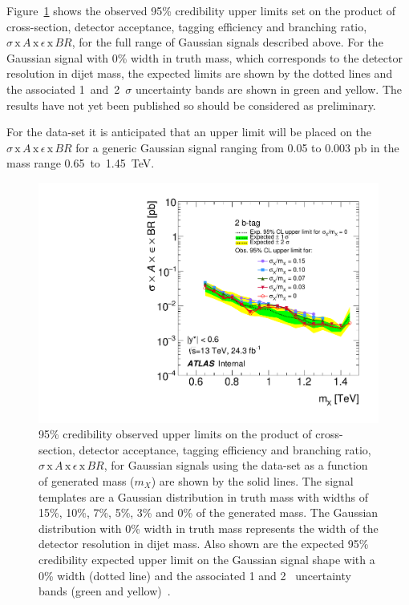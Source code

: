 Figure~\ref{fig:lim-lowmass_gauss} shows the observed 95\% credibility upper limits set 
on the product of cross-section, detector acceptance, tagging efficiency and branching ratio,
$\sigma\,\text{x}\,\mathit{A}\,\text{x}\,\epsilon\,\text{x}\,\mathit{BR}$,
for the full range of Gaussian signals described above.
For the Gaussian signal with 0\% width in truth mass, which corresponds to the detector resolution in dijet mass,
the expected limits are shown by the dotted lines and the associated 1~and~2~$\sigma$ uncertainty bands are shown in green and yellow.
The results have not yet been published so should be considered as preliminary.

For the \lm{} data-set it is anticipated that an upper limit will be placed on the $\sigma\,\text{x}\,\mathit{A}\,\text{x}\,\epsilon\,\text{x}\,\mathit{BR}$
for a generic Gaussian signal ranging from 0.05 to 0.003 pb in the mass range 0.65~to~1.45~TeV.

\begin{figure}[!ht]
  \begin{center}
    \includegraphics[width=0.9\linewidth, angle=0]{figs/Dibjet/lowmass/lim-gaussian.pdf}
  \vspace{-1.5em}
  \end{center}
  \caption[95\% credibility upper limits
    on the product of cross-section, detector acceptance, tagging efficiency and branching ratio
    for Gaussian signals using the \lm{} data-set.]
  {95\% credibility observed upper limits
    on the product of cross-section, detector acceptance, tagging efficiency and branching ratio,
    $\sigma\,\text{x}\,\mathit{A}\,\text{x}\,\epsilon\,\text{x}\,\mathit{BR}$,
    for Gaussian signals using the \lm{} data-set as a function of generated mass ($m_X$) are shown by the solid lines.
    The signal templates are a Gaussian distribution in truth mass with
    widths of 15\%, 10\%, 7\%, 5\%, 3\% and 0\% of the generated mass.
    The Gaussian distribution with 0\% width in truth mass represents the width of the detector resolution in dijet mass.
    Also shown are the expected 95\% credibility expected upper limit on the Gaussian signal shape with a 0\% width (dotted line)
    and the associated 1 and 2~\sigma{} uncertainty bands (green and yellow)~\cite{dibjet-full_int}.
  }
  \label{fig:lim-lowmass_gauss}
\end{figure}
